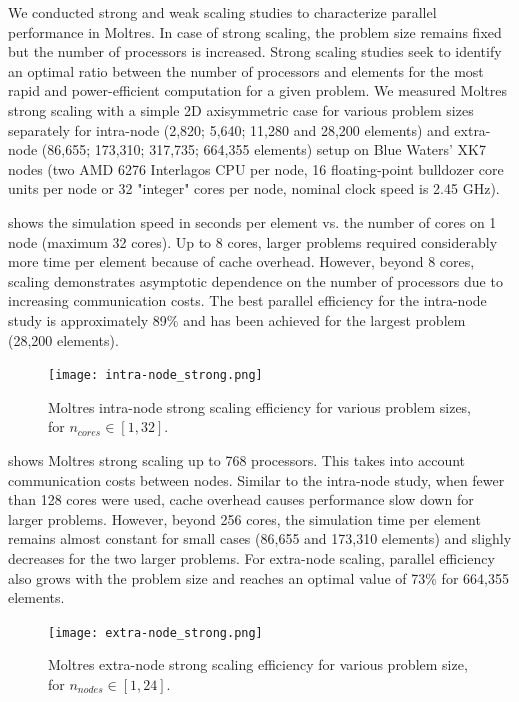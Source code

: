 \documentclass{article}
\begin{document}
We conducted strong and weak scaling studies to characterize parallel
performance in Moltres.
In case of strong scaling, the problem size remains fixed but the number of
processors is increased. Strong scaling studies seek to identify an
optimal ratio between the number of processors and elements for the most
rapid and power-efficient computation for a given problem. We measured
Moltres strong scaling with a simple 2D axisymmetric
case for various problem sizes separately for intra-node (2,820; 5,640;
11,280 and 28,200 elements) and extra-node (86,655; 173,310; 317,735;
664,355 elements) setup on Blue Waters' XK7 nodes (two AMD 6276 Interlagos
CPU per node, 16 floating-point bulldozer core units per node or 32 "integer"
cores per node, nominal clock speed is 2.45 GHz).

 shows the simulation speed in seconds
per element vs. the number of cores on 1 node (maximum 32 cores). Up to 8
cores, larger problems required considerably more time per
element because of cache overhead. However, beyond 8 cores, scaling demonstrates
asymptotic dependence on the number of processors due to increasing
communication costs. The best parallel efficiency for the intra-node study
is approximately 89\% and has been achieved for the largest problem
(28,200 elements).

\begin{figure}[htpb]
  \centering
  \texttt{[image: intra-node\_strong.png]}
  \caption{Moltres intra-node strong scaling efficiency for various problem
        sizes, for $n_{cores} \in [1,32]$.}
  \label{fig:intra_strong_scaling}
\end{figure}

 shows Moltres strong scaling up to 768
processors. This takes into account communication costs between nodes.
Similar to the intra-node study, when fewer than 128 cores were used,
cache overhead causes performance slow down for larger problems. However,
beyond 256 cores, the simulation time per element remains almost constant
for small cases (86,655 and 173,310 elements) and slighly decreases for the
two larger problems. For extra-node scaling, parallel efficiency also grows
with the problem size and reaches an optimal value of 73\% for 664,355 elements.

\begin{figure}[htpb]
  \centering
  \texttt{[image: extra-node\_strong.png]}
  \caption{Moltres extra-node strong scaling efficiency for various problem size, for $n_{nodes} \in [1,24]$.}
  \label{fig:extra_strong_scaling}
\end{figure}
\end{document}
